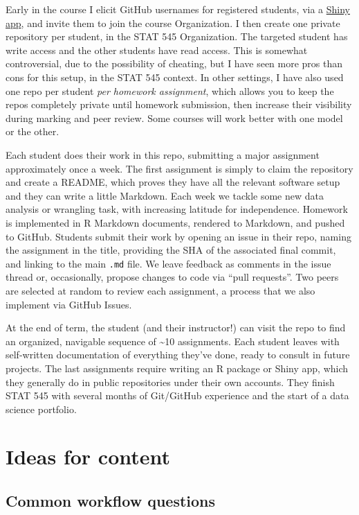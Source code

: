 \documentclass[
]{book}
\begin{document}
Early in the course I elicit GitHub usernames for registered students, via a \href{https://shiny.rstudio.com}{Shiny app}, and invite them to join the course Organization. I then create one private repository per student, in the STAT 545 Organization. The targeted student has write access and the other students have read access. This is somewhat controversial, due to the possibility of cheating, but I have seen more pros than cons for this setup, in the STAT 545 context. In other settings, I have also used one repo per student \emph{per homework assignment}, which allows you to keep the repos completely private until homework submission, then increase their visibility during marking and peer review. Some courses will work better with one model or the other.

Each student does their work in this repo, submitting a major assignment approximately once a week. The first assignment is simply to claim the repository and create a README, which proves they have all the relevant software setup and they can write a little Markdown. Each week we tackle some new data analysis or wrangling task, with increasing latitude for independence. Homework is implemented in R Markdown documents, rendered to Markdown, and pushed to GitHub. Students submit their work by opening an issue in their repo, naming the assignment in the title, providing the SHA of the associated final commit, and linking to the main \texttt{.md} file. We leave feedback as comments in the issue thread or, occasionally, propose changes to code via ``pull requests''. Two peers are selected at random to review each assignment, a process that we also implement via GitHub Issues.

At the end of term, the student (and their instructor!) can visit the repo to find an organized, navigable sequence of \textasciitilde10 assignments. Each student leaves with self-written documentation of everything they've done, ready to consult in future projects. The last assignments require writing an R package or Shiny app, which they generally do in public repositories under their own accounts. They finish STAT 545 with several months of Git/GitHub experience and the start of a data science portfolio.

\chapter{Ideas for content}\label{ideas-for-content}

\section{Common workflow questions}\label{common-workflow-questions}
\end{document}
